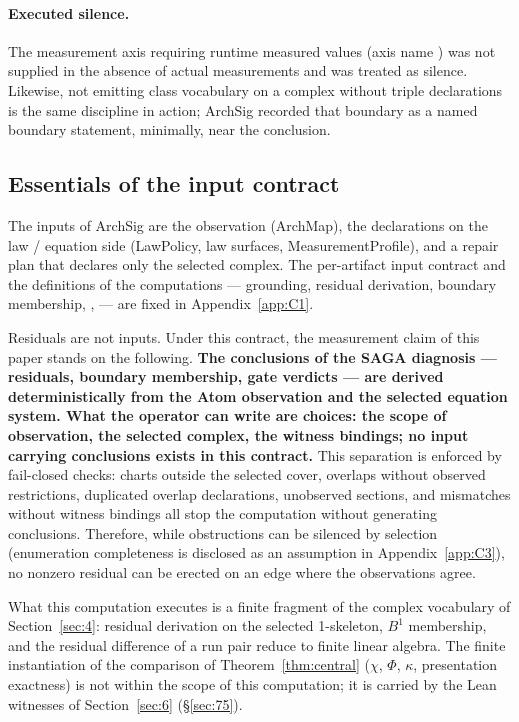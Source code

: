 \paragraph{Executed silence.}
The measurement axis requiring runtime measured values (axis name
) was not supplied in the absence of actual
measurements and was treated as silence. Likewise, not emitting class
vocabulary on a complex without triple declarations is the same
discipline in action; ArchSig recorded that boundary as a named
boundary statement, minimally, near the conclusion.

\subsection{Essentials of the input contract}\label{sec:74}

The inputs of ArchSig are the observation (ArchMap), the declarations
on the law / equation side (LawPolicy, law surfaces,
MeasurementProfile), and a repair plan that declares only the selected
complex. The per-artifact input contract and the definitions of the
computations --- grounding, residual derivation, boundary membership,
,  --- are fixed in Appendix~\ref{app:C1}.

Residuals are not inputs. Under this contract, the measurement claim
of this paper stands on the following. \textbf{The conclusions of the
SAGA diagnosis --- residuals, boundary membership, gate verdicts ---
are derived deterministically from the Atom observation and the
selected equation system. What the operator can write are choices: the
scope of observation, the selected complex, the witness bindings; no
input carrying conclusions exists in this contract.} This separation
is enforced by fail-closed checks: charts outside the selected cover,
overlaps without observed restrictions, duplicated overlap
declarations, unobserved sections, and mismatches without witness
bindings all stop the computation without generating conclusions.
Therefore, while obstructions can be silenced by selection
(enumeration completeness is disclosed as an assumption in
Appendix~\ref{app:C3}), no nonzero residual can be erected on an edge
where the observations agree.

What this computation executes is a finite fragment of the complex
vocabulary of Section~\ref{sec:4}: residual derivation on the selected
1-skeleton, $B^1$ membership, and the residual difference of a run
pair reduce to finite  linear algebra. The finite
instantiation of the comparison of Theorem~\ref{thm:central} ($\chi$,
$\Phi$, $\kappa$, presentation exactness) is not within the scope of
this computation; it is carried by the Lean witnesses of
Section~\ref{sec:6} (\S\ref{sec:75}).

